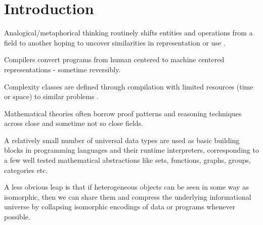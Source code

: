 \documentclass[]{INCLUDES/llncs}
\begin{document}

\begin{comment}
\begin{code}
module ISO where
import Data.List
import Data.Bits
import Data.Graph
import Data.Char
import Array
import Ratio
import Random
import Data.Graph.Inductive
import Graphics.Gnuplot.Simple
import Funsat.Solver
import Funsat.Types hiding (with)
import Data.Set hiding (map, filter, union, partition)
\end{code}
\end{comment}

\section{Introduction}

Analogical/metaphorical thinking routinely shifts entities and
operations from a field to another hoping to uncover similarities in representation
or use \cite{lakoff}.

Compilers convert programs from human centered to machine centered
representations - sometime reversibly.

Complexity classes are defined through compilation with limited resources
(time or space) to similar problems
\cite{Cook04theoriesfor,Cook93functionalinterpretations}.

Mathematical theories often borrow proof patterns and reasoning
techniques across close and sometime not so close fields.

A relatively small number of universal data types are used as basic building
blocks in programming languages and their runtime interpreters,
corresponding to a few well tested mathematical abstractions like sets,
functions, graphs, groups, categories etc.

\begin{comment}
Hence everyone explicitly or implicitly knows that ultimately, 
``everything is everything'' through lower common denominators like
bitstring representations in computer memory. From hackers and compiler writers 
to combinatorialists and experimental mathematicians,
it is not uncommon to shapeshift between various data types. 
Means as simple as binary editors, union types or overlapping variable
definitions are generously providing such alternate views.
\end{comment}

A less obvious leap is that if heterogeneous objects can be seen
in some way as isomorphic, then we can share them and
compress the underlying informational universe by collapsing
isomorphic encodings of data or programs whenever possible.
\end{document}

